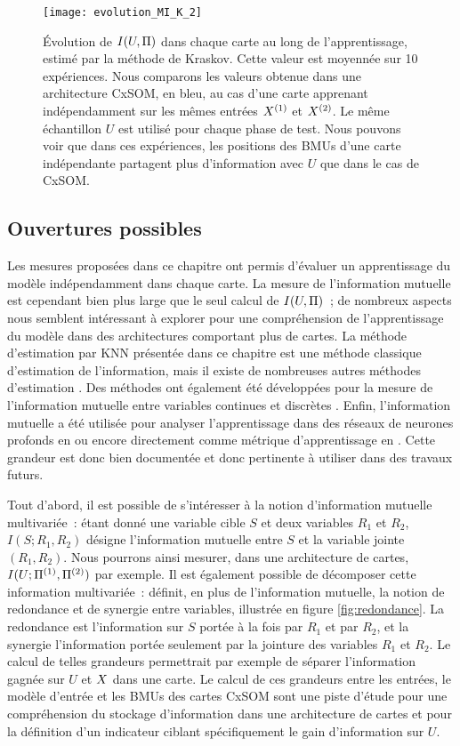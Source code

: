 \documentclass[../main]{subfiles}
\begin{document}
\begin{figure}
\centering\texttt{[image: evolution\_MI\_K\_2]}
\caption{\'Evolution de $I(U,\Pi)$ dans chaque carte au long de l'apprentissage, estimé par la méthode de Kraskov.
Cette valeur est moyennée sur 10 expériences. Nous comparons les valeurs obtenue dans une architecture CxSOM, en bleu, au cas d'une carte apprenant indépendamment sur les mêmes entrées $X^{({1})}$ et $X^{({2})}$.
Le même échantillon $U$ est utilisé pour chaque phase de test.
Nous pouvons voir que dans ces expériences, les positions des BMUs d'une carte indépendante partagent plus d'information avec $U$ que dans le cas de CxSOM. 
\label{fig:MI_evol_total}}
\end{figure}

\subsection{Ouvertures possibles}

Les mesures proposées dans ce chapitre ont permis d'évaluer un apprentissage du modèle indépendamment dans chaque carte.
La mesure de l'information mutuelle est cependant bien plus large que le seul calcul de $I(U,\Pi)$~; de nombreux aspects nous semblent intéressant à explorer pour une compréhension de l'apprentissage du modèle dans des architectures comportant plus de cartes. 
La méthode d'estimation par KNN présentée dans ce chapitre est une méthode classique d'estimation de l'information, mais il existe de nombreuses autres méthodes d'estimation \cite{Doquire2012ACO}. Des méthodes ont également été développées pour la mesure de l'information mutuelle entre variables continues et discrètes \cite{ross_mutual_2014, Gao2017EstimatingMI}. Enfin, l'information mutuelle a été utilisée pour analyser l'apprentissage dans des réseaux de neurones profonds en \cite{ShwartzZiv2017OpeningTB} ou encore directement comme métrique d'apprentissage en \cite{Hjelm2018LearningDR}.
Cette grandeur est donc bien documentée et donc pertinente à utiliser dans des travaux futurs.

Tout d'abord, il est possible de s'intéresser à la notion d'information mutuelle multivariée~: étant donné une variable cible $S$ et deux variables $R_1$ et $R_2$, $I(S;R_1,R_2)$ désigne l'information mutuelle entre $S$ et la variable jointe $(R_1,R_2)$. Nous pourrons ainsi mesurer, dans une architecture de cartes, $I(U; \Pi^{({1})}, \Pi^{({2})})$ par exemple.
Il est également possible de décomposer cette information multivariée~: \cite{williams_nonnegative_2010} définit, en plus de l'information mutuelle, la notion de redondance et de synergie entre variables, illustrée en figure \ref{fig:redondance}.
La redondance est l'information sur $S$ portée à la fois par $R_1$ et par $R_2$, et la synergie l'information portée seulement par la jointure des variables $R_1$ et $R_2$. Le calcul de telles grandeurs permettrait par exemple de séparer l'information gagnée sur $U$ et $X$ dans une carte.
Le calcul de ces grandeurs entre les entrées, le modèle d'entrée et les BMUs des cartes CxSOM sont une piste d'étude pour une compréhension du stockage d'information dans une architecture de cartes et pour la définition d'un indicateur ciblant spécifiquement le gain d'information sur $U$.
\end{document}
